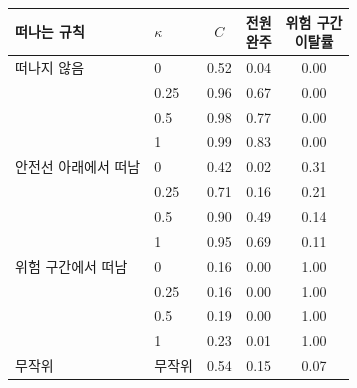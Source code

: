 \begin{tabular}{@{}llccc@{}}
\toprule
떠나는 규칙 & $\kappa$ & $C$ & \shortstack{전원\\완주} & \shortstack{위험 구간\\이탈률} \\
\midrule
떠나지 않음 & 0 & 0.52 & 0.04 & 0.00 \\
 & 0.25 & 0.96 & 0.67 & 0.00 \\
 & 0.5 & 0.98 & 0.77 & 0.00 \\
 & 1 & 0.99 & 0.83 & 0.00 \\
\addlinespace[2pt]
안전선 아래에서 떠남 & 0 & 0.42 & 0.02 & 0.31 \\
 & 0.25 & 0.71 & 0.16 & 0.21 \\
 & 0.5 & 0.90 & 0.49 & 0.14 \\
 & 1 & 0.95 & 0.69 & 0.11 \\
\addlinespace[2pt]
위험 구간에서 떠남 & 0 & 0.16 & 0.00 & 1.00 \\
 & 0.25 & 0.16 & 0.00 & 1.00 \\
 & 0.5 & 0.19 & 0.00 & 1.00 \\
 & 1 & 0.23 & 0.01 & 1.00 \\
\addlinespace[2pt]
무작위 & 무작위 & 0.54 & 0.15 & 0.07 \\
\bottomrule
\end{tabular}
